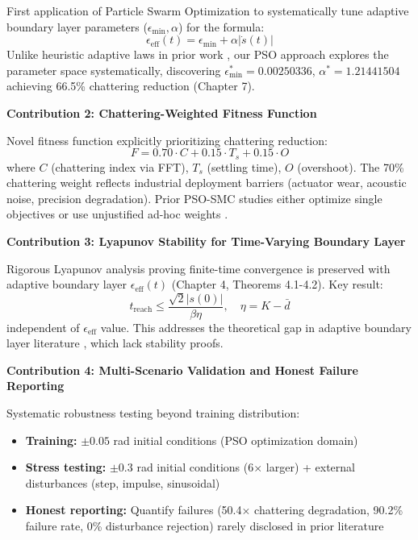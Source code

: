 First application of Particle Swarm Optimization to systematically tune adaptive boundary layer parameters ($\epsilon_{\min}, \alpha$) for the formula:
\begin{equation}
\epsilon_{\text{eff}}(t) = \epsilon_{\min} + \alpha |\dot{s}(t)|
\label{eq:adaptive_boundary_formula}
\end{equation}
Unlike heuristic adaptive laws in prior work \cite{ieee2018selfreg,ship2024adaptive}, our PSO approach explores the parameter space systematically, discovering $\epsilon_{\min}^* = 0.00250336$, $\alpha^* = 1.21441504$ achieving 66.5\% chattering reduction (Chapter 7).

\textbf{Contribution 2: Chattering-Weighted Fitness Function}

Novel fitness function explicitly prioritizing chattering reduction:
\begin{equation}
F = 0.70 \cdot C + 0.15 \cdot T_s + 0.15 \cdot O
\label{eq:chattering_weighted_fitness}
\end{equation}
where $C$ (chattering index via FFT), $T_s$ (settling time), $O$ (overshoot). The 70\% chattering weight reflects industrial deployment barriers (actuator wear, acoustic noise, precision degradation). Prior PSO-SMC studies either optimize single objectives \cite{ayinalem2025pso} or use unjustified ad-hoc weights \cite{hepso2025manipulator}.

\textbf{Contribution 3: Lyapunov Stability for Time-Varying Boundary Layer}

Rigorous Lyapunov analysis proving finite-time convergence is preserved with adaptive boundary layer $\epsilon_{\text{eff}}(t)$ (Chapter 4, Theorems 4.1-4.2). Key result:
\begin{equation}
t_{\text{reach}} \leq \frac{\sqrt{2} |s(0)|}{\beta \eta}, \quad \eta = K - \bar{d}
\label{eq:reaching_time_adaptive}
\end{equation}
independent of $\epsilon_{\text{eff}}$ value. This addresses the theoretical gap in adaptive boundary layer literature \cite{ieee2018selfreg,frontiers2024fuzzy}, which lack stability proofs.

\textbf{Contribution 4: Multi-Scenario Validation and Honest Failure Reporting}

Systematic robustness testing beyond training distribution:
\begin{itemize}
\item \textbf{Training:} $\pm 0.05$ rad initial conditions (PSO optimization domain)
\item \textbf{Stress testing:} $\pm 0.3$ rad initial conditions (6$\times$ larger) + external disturbances (step, impulse, sinusoidal)
\item \textbf{Honest reporting:} Quantify failures (50.4$\times$ chattering degradation, 90.2\% failure rate, 0\% disturbance rejection) rarely disclosed in prior literature
\end{itemize}

